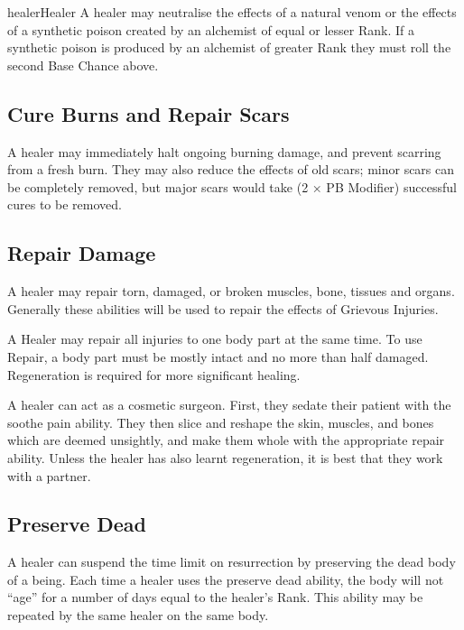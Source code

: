 \begin{Skill}[1.4]{healer}{Healer}
A healer may neutralise the effects of a natural venom or the effects
of a synthetic poison created by an alchemist of equal or lesser Rank.
If a synthetic poison is produced by an alchemist of greater Rank they
must roll the second Base Chance above.

\subsection{Cure Burns and Repair Scars}

A healer may immediately halt ongoing burning damage, and prevent
scarring from a fresh burn.  They may also reduce the effects of old
scars; minor scars can be completely removed, but major scars would
take (2 × PB Modifier) successful cures to be removed.

\subsection{Repair Damage}

A healer may repair torn, damaged, or broken muscles, bone, tissues
and organs. Generally these abilities will be used to repair the
effects of Grievous Injuries.

A Healer may repair all injuries to one body part at the same time. To
use Repair, a body part must be mostly intact and no more than half
damaged.  Regeneration is required for more significant healing.

A healer can act as a cosmetic surgeon. First, they sedate their
patient with the soothe pain ability.  They then slice and reshape the
skin, muscles, and bones which are deemed unsightly, and make them
whole with the appropriate repair ability.  Unless the healer has also
learnt regeneration, it is best that they work with a partner.

\subsection{Preserve Dead}

A healer can suspend the time limit on resurrection by preserving the
dead body of a being. Each time a healer uses the preserve dead
ability, the body will not “age” for a number of days equal to the
healer’s Rank. This ability may be repeated by the same healer on the
same body.


\end{Skill}
